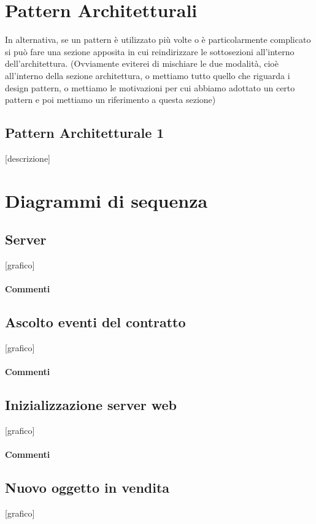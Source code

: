 \documentclass[a4paper, 12pt]{article}
\begin{document}
\clearpage

\section{Pattern Architetturali}
In alternativa, se un pattern è utilizzato più volte o è particolarmente complicato si può fare una sezione apposita in cui reindirizzare le sottosezioni all'interno dell'architettura. (Ovviamente eviterei di mischiare le due modalità, cioè all'interno della sezione architettura, o mettiamo tutto quello che riguarda i design pattern, o mettiamo le motivazioni per cui abbiamo adottato un certo pattern e poi mettiamo un riferimento a questa sezione)
\subsection{Pattern Architetturale 1}
[descrizione]



\clearpage

\section{Diagrammi di sequenza}
\subsection{Server}
[grafico]
\paragraph{Commenti}

\subsection{Ascolto eventi del contratto}
[grafico]
\paragraph{Commenti}

\subsection{Inizializzazione server web}
[grafico]
\paragraph{Commenti}

\subsection{Nuovo oggetto in vendita}
[grafico]
\end{document}
